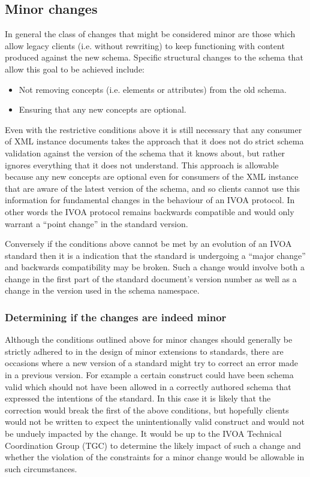\documentclass[10pt,a4paper]{ivoa}
\begin{document}
\subsection{Minor changes}
In general the class of changes that might be considered minor are those
which allow legacy clients (i.e. without rewriting) to keep functioning with
content produced against the new schema.
Specific structural changes to the schema that allow this goal to be achieved
include:

\begin{itemize}
  \item Not removing concepts (i.e. elements or attributes) from the old
  schema.
  \item Ensuring that any new concepts are optional.
\end{itemize}
Even with the restrictive conditions above it is still necessary that any
consumer of XML instance documents takes the approach that it does not do strict
schema validation against the version of the schema that it knows about, but
rather ignores everything that it does not understand. This approach is allowable
because any new concepts are optional even for consumers of the XML instance
that are aware of the latest version of the schema, and so clients cannot use
this information for fundamental changes in the behaviour of an IVOA protocol.
In other words the IVOA protocol remains backwards compatible and would only
warrant a ``point change'' in the standard version.

Conversely if the conditions above cannot be met by an evolution of an IVOA
standard then it is a indication that the standard is undergoing a ``major
change'' and backwards compatibility may be broken. Such a change would
involve both a change in the first part of the standard document's version
 number as well as a change in the version used in the schema
namespace.
\subsubsection{Determining if the changes are indeed minor}
Although the conditions outlined above for minor changes should generally be
strictly adhered to in the design of minor extensions to standards, there are
occasions where a new version of a standard might try to correct an error made
in a previous version. For example a certain construct could have been
schema valid which should not have been allowed in a correctly authored
schema that expressed the intentions of the standard. In this case it is likely
that the correction would break the first of the above conditions, but hopefully
clients would not be written to expect the unintentionally valid construct and
would not be unduely impacted by the change. It would be up to the IVOA
Technical Coordination Group (TGC) to determine the likely impact of such a
change and whether the violation of the constraints for a minor change would be
allowable in such circumstances.
\end{document}
